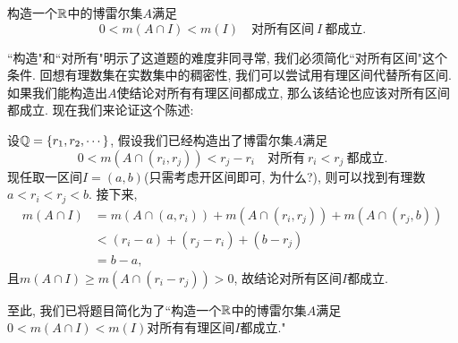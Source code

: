 \begin{example}
    构造一个$\mathbb{R}$中的博雷尔集$A$满足
    $$ 0<m(A \cap I)<m(I) \quad \text{对所有区间}~I~\text{都成立}. $$
\end{example}
\begin{solution}
    ``构造"和``对所有"明示了这道题的难度非同寻常, 我们必须简化``对所有区间"这个条件. 回想有理数集在实数集中的稠密性, 我们可以尝试用有理区间代替所有区间. 如果我们能构造出$A$使结论对所有有理区间都成立, 那么该结论也应该对所有区间都成立. 现在我们来论证这个陈述:

    设$\mathbb{Q} = \{r_1, r_2, \cdots\}$, 假设我们已经构造出了博雷尔集$A$满足
    $$0 < m(A \cap (r_i,r_j)) < r_j - r_i \quad \text{对所有}~r_i<r_j~\text{都成立}.$$
    现任取一区间$I=(a,b)$(只需考虑开区间即可, 为什么?), 则可以找到有理数$a<r_i<r_j<b$. 接下来,
    \begin{align*}
    m(A \cap I)
    &= m(A \cap (a,r_i)) + m(A \cap (r_i,r_j)) + m(A \cap (r_j,b)) \\
    &< (r_i-a) + (r_j - r_i) + (b-r_j) \\
    &= b-a,
    \end{align*}
    且$m(A \cap I) \geq m(A \cap (r_i-r_j)) > 0$, 故结论对所有区间$I$都成立. 

    至此, 我们已将题目简化为了``构造一个$\mathbb{R}$中的博雷尔集$A$满足$0<m(A \cap I)<m(I)$对所有有理区间$I$都成立."
    
\end{solution}

